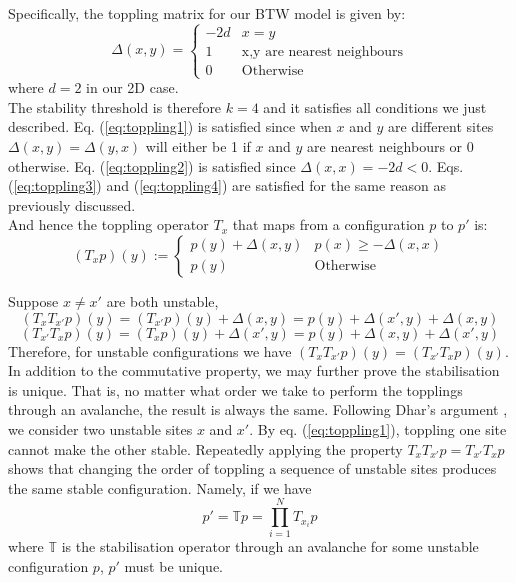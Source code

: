 Specifically, the toppling matrix for our BTW model is given by:
\begin{equation}\label{eq:topplingbtw}
    \Delta(x,y)=\begin{cases}
        -2d & x=y \\
        1 & \text{x,y are nearest neighbours}\\
        0 & \text{Otherwise}
    \end{cases}
\end{equation}
where $d=2$ in our 2D case.\\

The stability threshold is therefore $k=4$ and it satisfies all conditions we just described. Eq. (\ref{eq:toppling1}) is satisfied since when  $x$ and $y$ are different sites $\Delta(x,y)=\Delta(y,x)$ will either be 1 if $x$ and $y$ are nearest neighbours or 0 otherwise. Eq. (\ref{eq:toppling2}) is satisfied since $\Delta(x,x)=-2d<0$. Eqs. (\ref{eq:toppling3}) and (\ref{eq:toppling4}) are satisfied for the same reason as previously discussed.\\

And hence the toppling operator $T_x$ that maps from a configuration $p$ to $p'$ is:
\begin{equation}
    (T_xp)(y):=\begin{cases}
        p(y)+\Delta(x,y) & p(x)\geq-\Delta(x,x) \\
        p(y) & \text{Otherwise}
    \end{cases}
\end{equation}

Suppose $x \neq x'$ are both unstable,
\[
(T_xT_{x'}p)(y)=(T_{x'}p)(y)+\Delta(x,y)=p(y)+\Delta(x',y)+\Delta(x,y)
\]
\[
(T_{x'}T_{x}p)(y)=(T_{x}p)(y)+\Delta(x',y)=p(y)+\Delta(x,y)+\Delta(x',y)
\]
Therefore, for unstable configurations we have $(T_xT_{x'}p)(y)=(T_{x'}T_{x}p)(y)$.\\

In addition to the commutative property, we may further prove the stabilisation is unique. That is, no matter what order we take to perform the topplings through an avalanche, the result is always the same. Following Dhar's argument \cite{dhar1999}, we consider two unstable sites $x$ and $x'$. By eq. (\ref{eq:toppling1}),  toppling one site cannot make the other stable. Repeatedly applying the property $T_xT_{x'}p=T_{x'}T_{x}p$ shows that changing the order of toppling a sequence of unstable sites produces the same stable configuration. Namely, if we have 
\[
p'=\mathbb{T}p=\prod_{i=1}^{N} T_{x_i}p
\]
where $\mathbb{T}$ is the stabilisation operator through an avalanche for some unstable configuration $p$, $p'$ must be unique. \\

